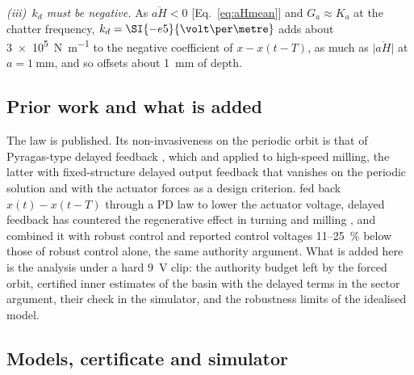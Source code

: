 \emph{(iii)~$k_d$ must be negative.} As $\overline{aH}<0$ [Eq.~\eqref{eq:aHmean}] and $G_a\approx K_a$ at the chatter frequency, $k_d=\SI{-e5}{\volt\per\metre}$ adds about \SI{3e5}{\newton\per\metre} to the negative coefficient of $x-x(t-T)$, as much as $\lvert\overline{aH}\rvert$ at $a=\SI{1}{\milli\metre}$, and so offsets about \SI{1}{\milli\metre} of depth.

\subsection{Prior work and what is added}\label{sec:delayed-prior}

The law is published. Its non-invasiveness on the periodic orbit is that of Pyragas-type delayed feedback \citep{pyragas1992continuous}, which \citet{vandewouw2015ifac} and \citet{vandijk2015ijrnc} applied to high-speed milling, the latter with fixed-structure delayed output feedback that vanishes on the periodic solution and with the actuator forces as a design criterion. \citet{li2022ijamt} fed back $x(t)-x(t-T)$ through a PD law to lower the actuator voltage, delayed feedback has countered the regenerative effect in turning \citep{mancisidor2019mechatronics} and milling \citep{du2022time}, and \citet{du2024ijms} combined it with robust control and reported control voltages 11--\SI{25}{\percent} below those of robust control alone, the same authority argument. What is added here is the analysis under a hard \SI{9}{\volt} clip: the authority budget left by the forced orbit, certified inner estimates of the basin with the delayed terms in the sector argument, their check in the simulator, and the robustness limits of the idealised model.

\subsection{Models, certificate and simulator}\label{sec:delayed-model}

